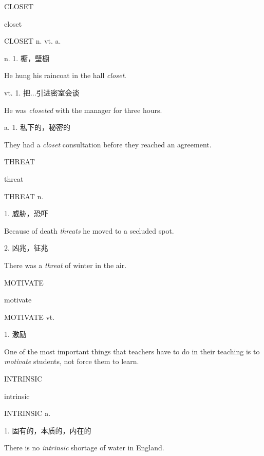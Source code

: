 \begin{flashcard}{
CLOSET

closet
}
\begin{center}
CLOSET n. vt. a. 
\end{center}
n. 1. 橱，壁橱

He hung his raincoat in the hall \textit{closet}.

vt. 1. 把...引进密室会谈

He was \textit{closeted} with the manager for three hours.

a. 1. 私下的，秘密的

They had a \textit{closet} consultation before they reached an agreement.

\end{flashcard}
\begin{flashcard}{
THREAT

threat
}
\begin{center}
THREAT n. 
\end{center}
1. 威胁，恐吓

Because of death \textit{threats} he moved to a secluded spot.

2. 凶兆，征兆

There was a \textit{threat} of winter in the air.

\end{flashcard}
\begin{flashcard}{
MOTIVATE

motivate
}
\begin{center}
MOTIVATE vt. 
\end{center}
1. 激励

One of the most important things that teachers have to do in their teaching is to \textit{motivate} students, not force them to learn.

\end{flashcard}
\begin{flashcard}{
INTRINSIC

intrinsic
}
\begin{center}
INTRINSIC a. 
\end{center}
1. 固有的，本质的，内在的

There is no \textit{intrinsic} shortage of water in England.

\end{flashcard}
